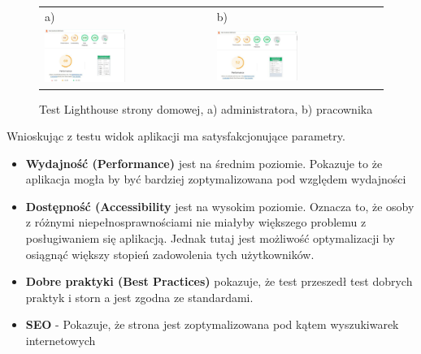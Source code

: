 \begin{figure}[htb]
  \centering
	\begin{tabular}{@{}ll@{}}
	a) & b) \\
  \includegraphics[width=0.5\textwidth]{rys06/lighthouse/adminLightHouse.pdf} & 
	\includegraphics[width=0.5\textwidth]{rys06/lighthouse/workerLightHouse.pdf}
	\end{tabular}
  \caption{Test Lighthouse strony domowej, a) administratora, b) pracownika}
  \label{lh:label}
\end{figure}

Wnioskując z testu widok aplikacji ma satysfakcjonujące parametry.
\begin{itemize}
\item \textbf{Wydajność (Performance)} jest na średnim poziomie. Pokazuje to że aplikacja mogła by być bardziej zoptymalizowana pod względem wydajności
\item \textbf{Dostępność (Accessibility} jest na wysokim poziomie. Oznacza to, że osoby z różnymi niepełnosprawnościami nie miałyby większego problemu z posługiwaniem się aplikacją. Jednak tutaj jest możliwość optymalizacji by osiągnąć większy stopień zadowolenia tych użytkowników.
\item \textbf{Dobre praktyki (Best Practices)} pokazuje, że test przeszedł test dobrych praktyk i storn a jest zgodna ze standardami.
\item \textbf{SEO} - Pokazuje, że strona jest zoptymalizowana pod kątem wyszukiwarek internetowych
\end{itemize}

